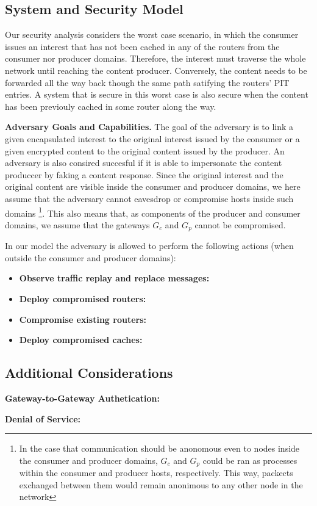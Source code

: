 \subsection{System and Security Model}

Our security analysis considers the worst case scenario, in which the consumer issues an interest that has not been cached in any of the routers from the consumer nor producer domains. Therefore, the interest must traverse the whole network until reaching the content producer. Conversely, the content needs to be forwarded all the way back though the same path satifying the routers' PIT entries. A system that is secure in this worst case is also secure when the content has been previouly cached in some router along the way.

\textbf{Adversary Goals and Capabilities.} The goal of the adversary is to link a given encapsulated interest to the original interest issued by the consumer or a given encrypted content to the original content issued by the producer. An adversary is also consired succesful if it is able to impersonate the content produccer by faking a content response. Since the original interest and the original content are visible inside the consumer and producer domains, we here assume that the adversary cannot eavesdrop or compromise hosts inside such domains \footnote{In the case that communication should be anonomous even to nodes inside the consumer and producer domains, $G_c$ and $G_p$ could be ran as processes within the consumer and producer hosts, respectively. This way, packects exchanged between them would remain anonimous to any other node in the network}. This also means that, as components of the producer and consumer domains, we assume that the gateways $G_c$ and $G_p$ cannot be compromised.

In our model the adversary is allowed to perform the following actions (when outside the consumer and producer domains):

\begin{itemize}
	\item \textbf{Observe traffic replay and replace messages:}
	\item \textbf{Deploy compromised routers:}
	\item \textbf{Compromise existing routers:}
	\item \textbf{Deploy compromised caches:}
\end{itemize}

\subsection{Additional Considerations}

\textbf{Gateway-to-Gateway Authetication:}

\textbf{Denial of Service:}


